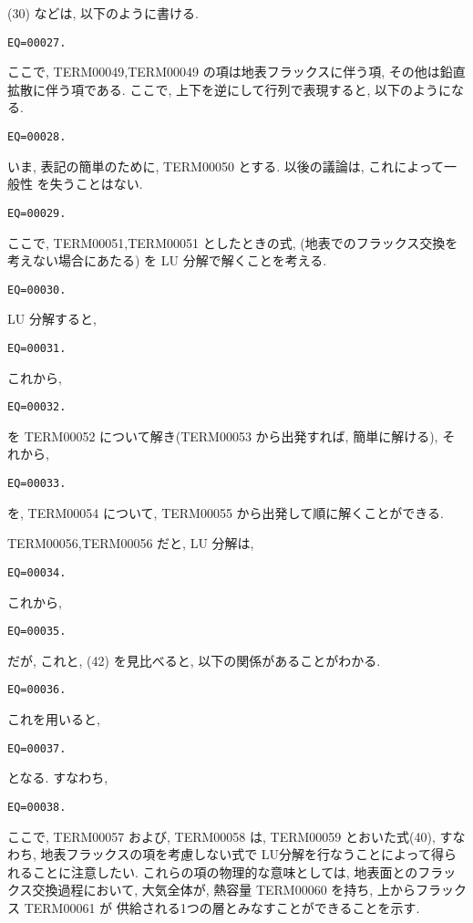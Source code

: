 (30) などは, 以下のように書ける.
%
\begin{verbatim}
EQ=00027.
\end{verbatim}
ここで, TERM00049,TERM00049
の項は地表フラックスに伴う項,
その他は鉛直拡散に伴う項である.
%
ここで, 上下を逆にして行列で表現すると, 以下のようになる.
%
\begin{verbatim}
EQ=00028.
\end{verbatim}

いま, 表記の簡単のために, TERM00050 とする.  以後の議論は, これによって一般性
を失うことはない.
%
\begin{verbatim}
EQ=00029.
\end{verbatim}
%
ここで,
TERM00051,TERM00051 としたときの式,
(地表でのフラックス交換を考えない場合にあたる)
を LU 分解で解くことを考える.
%
\begin{verbatim}
EQ=00030.
\end{verbatim}

LU 分解すると,
%
\begin{verbatim}
EQ=00031.
\end{verbatim}
%
これから, 
%
\begin{verbatim}
EQ=00032.
\end{verbatim}
%
を TERM00052 について解き(TERM00053 から出発すれば, 簡単に解ける), 
それから,
%
\begin{verbatim}
EQ=00033.
\end{verbatim}
%
を, TERM00054 について, TERM00055 から出発して順に解くことができる.

TERM00056,TERM00056 だと, LU 分解は, 
%
\begin{verbatim}
EQ=00034.
\end{verbatim}
%
これから, 
%
\begin{verbatim}
EQ=00035.
\end{verbatim}
%
だが, これと, (42) を見比べると, 以下の関係があることがわかる.
%
\begin{verbatim}
EQ=00036.
\end{verbatim}
%
これを用いると,
%
\begin{verbatim}
EQ=00037.
\end{verbatim}
%
となる. すなわち,
%
\begin{verbatim}
EQ=00038.
\end{verbatim}
%
ここで, TERM00057 および, TERM00058 は,
TERM00059 とおいた式(40),
すなわち, 地表フラックスの項を考慮しない式で
LU分解を行なうことによって得られることに注意したい.
これらの項の物理的な意味としては,
地表面とのフラックス交換過程において,
大気全体が, 熱容量 TERM00060 を持ち, 
上からフラックス TERM00061 が
供給される1つの層とみなすことができることを示す.

